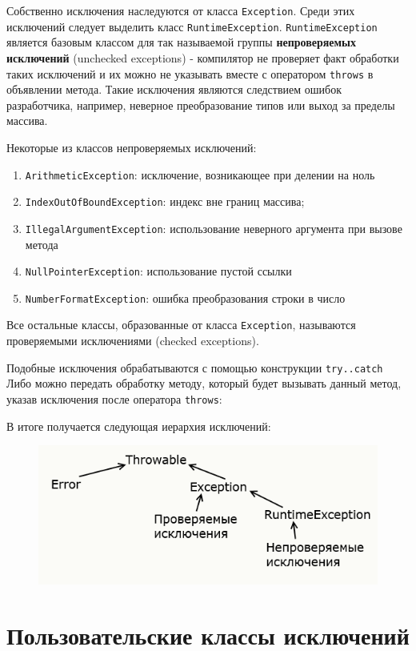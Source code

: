 Собственно исключения наследуются от класса \verb|Exception|. Среди этих исключений следует выделить класс \verb|RuntimeException|. \verb|RuntimeException| является базовым классом для так называемой группы \textbf{непроверяемых исключений} (unchecked exceptions) - компилятор не проверяет факт обработки таких исключений и их можно не указывать вместе с оператором \verb|throws| в объявлении метода. Такие исключения являются следствием ошибок разработчика, например, неверное преобразование типов или выход за пределы массива.

Некоторые из классов непроверяемых исключений:
\begin{enumerate}
    \item \verb|ArithmeticException|: исключение, возникающее при делении на ноль
    \item \verb|IndexOutOfBoundException|: индекс вне границ массива;
    \item \verb|IllegalArgumentException|: использование неверного аргумента при вызове метода
    \item \verb|NullPointerException|: использование пустой ссылки
    \item \verb|NumberFormatException|: ошибка преобразования строки в число
\end{enumerate}

Все остальные классы, образованные от класса \verb|Exception|, называются проверяемыми исключениями (checked exceptions).

Подобные исключения обрабатываются с помощью конструкции \verb|try..catch| Либо можно передать обработку методу, который будет вызывать данный метод, указав исключения после оператора \verb|throws|:

В итоге получается следующая иерархия исключений:

\begin{figure}[h]
\centering
\includegraphics[width=0.8\linewidth]{pic23-1.png}
\label{fig:mpr}
\end{figure}

\section{Пользовательские классы исключений}

